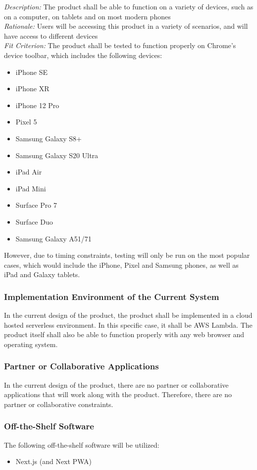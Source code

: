 \documentclass[12pt]{article}
\begin{document}
\emph{Description:} The product shall be able to function on a variety of devices, such as on a computer, on tablets and on most modern phones\\
\emph{Rationale:} Users will be accessing this product in a variety of scenarios, and will have access to different devices\\
\emph{Fit Criterion:} The product shall be tested to function properly on Chrome's device toolbar, which includes the following devices:
\begin{itemize}
	\item iPhone SE
	\item iPhone XR
	\item iPhone 12 Pro
	\item Pixel 5
	\item Samsung Galaxy S8+
	\item Samsung Galaxy S20 Ultra
	\item iPad Air
	\item iPad Mini
	\item Surface Pro 7
	\item Surface Duo
	\item Samsung Galaxy A51/71
\end{itemize}

However, due to timing constraints, testing will only be run on the most popular cases, which would
include the iPhone, Pixel and Samsung phones, as well as iPad and Galaxy tablets.

\subsubsection{Implementation Environment of the Current System}
In the current design of the product, the product shall be implemented in a cloud hosted serverless
environment. In this specific case, it shall be AWS Lambda. The product itself shall also be able
to function properly with any web browser and operating system.

\subsubsection{Partner or Collaborative Applications}
In the current design of the product, there are no partner or collaborative applications that will
work along with the product. Therefore, there are no partner or collaborative constraints.

\subsubsection{Off-the-Shelf Software}
The following off-the-shelf software will be utilized:
\begin{itemize}
	\item Next.js (and Next PWA)
\end{itemize}
\end{document}
